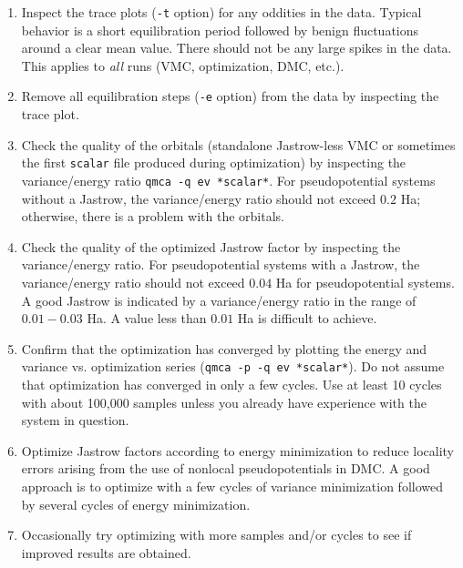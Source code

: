 \begin{enumerate}
  \item{Inspect the trace plots (\texttt{-t} option) for any 
    oddities in the data.  Typical behavior is a short equilibration 
    period followed by benign fluctuations around a clear mean value.  
    There should not be any large spikes in the data. This applies 
    to \emph{all} runs (VMC, optimization, DMC, etc.).}

  \item{Remove all equilibration steps (\texttt{-e} option) from 
    the data by inspecting the trace plot.}

  \item{Check the quality of the orbitals (standalone Jastrow-less 
    VMC or sometimes the first \texttt{scalar} file produced during 
    optimization) by inspecting the variance/energy ratio 
    \texttt{qmca -q ev *scalar*}.  For pseudopotential systems 
    without a Jastrow, the variance/energy ratio should not exceed 
    $0.2$ Ha; otherwise, there is a problem with the orbitals.}

  \item{Check the quality of the optimized Jastrow factor by inspecting 
    the variance/energy ratio.  For pseudopotential systems with a 
    Jastrow, the variance/energy ratio should not exceed $0.04$ Ha 
    for pseudopotential systems.  A good Jastrow is indicated by a 
    variance/energy ratio in the range of $0.01-0.03$ Ha.  A value less 
    than $0.01$ Ha is difficult to achieve.}

  \item{Confirm that the optimization has converged by plotting the 
    energy and variance vs. optimization series 
    (\texttt{qmca -p -q ev *scalar*}).  Do not assume that 
    optimization has converged in only a few cycles.  Use at least 
    10 cycles with about 100,000 samples unless you already have 
    experience with the system in question.}

  \item{Optimize Jastrow factors according to energy minimization to 
    reduce locality errors arising from the use of nonlocal 
    pseudopotentials in DMC.  A good approach is to optimize with a 
    few cycles of variance minimization followed by several cycles of 
    energy minimization.}

  \item{Occasionally try optimizing with more samples and/or cycles 
    to see if improved results are obtained.}


\end{enumerate}
